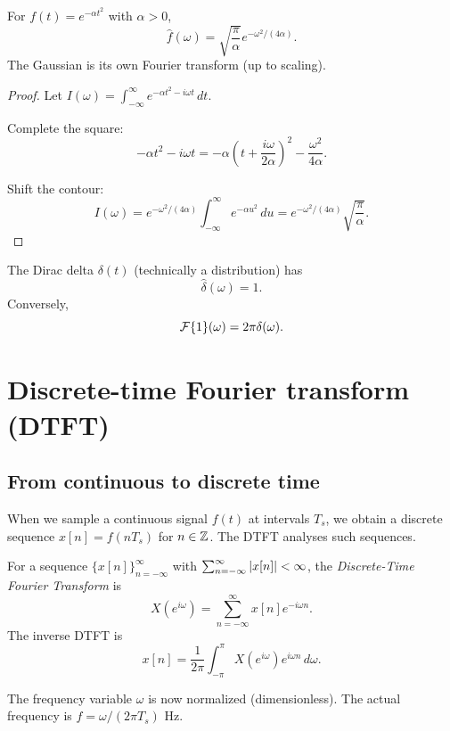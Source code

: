 \begin{notechapter}
\begin{example}[Gaussian]
For $f(t) = e^{-\alpha t^2}$ with $\alpha > 0$,
\[
\hat{f}(\omega) = \sqrt{\frac{\pi}{\alpha}} e^{-\omega^2/(4\alpha)}.
\]
The Gaussian is its own Fourier transform (up to scaling).
\end{example}

\begin{proof}
Let $I(\omega) = \int_{-\infty}^{\infty} e^{-\alpha t^2 - i\omega t} \, dt$.

Complete the square:
\[
-\alpha t^2 - i\omega t = -\alpha \left( t + \frac{i\omega}{2\alpha} \right)^2 - \frac{\omega^2}{4\alpha}.
\]

Shift the contour:
\[
I(\omega) = e^{-\omega^2/(4\alpha)} \int_{-\infty}^{\infty} e^{-\alpha u^2} \, du = e^{-\omega^2/(4\alpha)} \sqrt{\frac{\pi}{\alpha}}.
\]
\end{proof}

\begin{example}
The Dirac delta $\delta(t)$ (technically a distribution) has
\[
\hat{\delta}(\omega) = 1.
\]
Conversely,
\[
\mathcal{F}\{1\}(\omega) = 2\pi \delta(\omega).
\]
\end{example}

\section{Discrete-time Fourier transform (DTFT)}

\subsection{From continuous to discrete time}

When we sample a continuous signal $f(t)$ at intervals $T_s$, we obtain a discrete sequence $x[n] = f(nT_s)$ for $n \in \mathbb{Z}$. The DTFT analyses such sequences.

\begin{definition}[DTFT]
For a sequence $\{x[n]\}_{n=-\infty}^{\infty}$ with $\sum_{n=-\infty}^{\infty} \left|x[n]\right| < \infty$, the \emph{Discrete-Time Fourier Transform} is
\[
X(e^{i\omega}) = \sum_{n=-\infty}^{\infty} x[n] e^{-i\omega n}.
\]
The inverse DTFT is
\[
x[n] = \frac{1}{2\pi} \int_{-\pi}^{\pi} X(e^{i\omega}) e^{i\omega n} \, d\omega.
\]
\end{definition}

\begin{remark}
The frequency variable $\omega$ is now normalized (dimensionless). The actual frequency is $f = \omega/(2\pi T_s)$ Hz.
\end{remark}


\end{notechapter}
